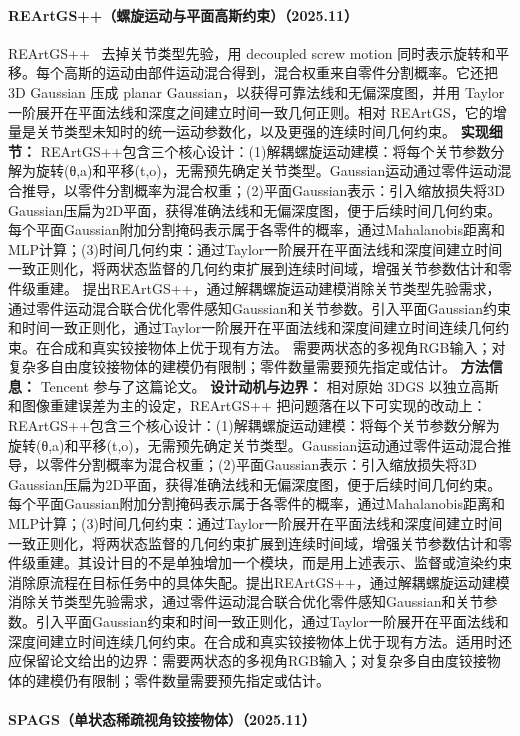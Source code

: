 \paragraph{REArtGS++（螺旋运动与平面高斯约束）（2025.11）}
REArtGS++~\cite{2511_17059} 去掉关节类型先验，用 decoupled screw motion 同时表示旋转和平移。每个高斯的运动由部件运动混合得到，混合权重来自零件分割概率。它还把 3D Gaussian 压成 planar Gaussian，以获得可靠法线和无偏深度图，并用 Taylor 一阶展开在平面法线和深度之间建立时间一致几何正则。相对 REArtGS，它的增量是关节类型未知时的统一运动参数化，以及更强的连续时间几何约束。
\textbf{实现细节：} REArtGS++包含三个核心设计：(1)解耦螺旋运动建模：将每个关节参数分解为旋转(θ,a)和平移(t,o)，无需预先确定关节类型。Gaussian运动通过零件运动混合推导，以零件分割概率为混合权重；(2)平面Gaussian表示：引入缩放损失将3D Gaussian压扁为2D平面，获得准确法线和无偏深度图，便于后续时间几何约束。每个平面Gaussian附加分割掩码表示属于各零件的概率，通过Mahalanobis距离和MLP计算；(3)时间几何约束：通过Taylor一阶展开在平面法线和深度间建立时间一致正则化，将两状态监督的几何约束扩展到连续时间域，增强关节参数估计和零件级重建。 提出REArtGS++，通过解耦螺旋运动建模消除关节类型先验需求，通过零件运动混合联合优化零件感知Gaussian和关节参数。引入平面Gaussian约束和时间一致正则化，通过Taylor一阶展开在平面法线和深度间建立时间连续几何约束。在合成和真实铰接物体上优于现有方法。 需要两状态的多视角RGB输入；对复杂多自由度铰接物体的建模仍有限制；零件数量需要预先指定或估计。
\textbf{方法信息：} Tencent 参与了这篇论文。
\textbf{设计动机与边界：} 相对原始 3DGS 以独立高斯和图像重建误差为主的设定，REArtGS++ 把问题落在以下可实现的改动上：REArtGS++包含三个核心设计：(1)解耦螺旋运动建模：将每个关节参数分解为旋转(θ,a)和平移(t,o)，无需预先确定关节类型。Gaussian运动通过零件运动混合推导，以零件分割概率为混合权重；(2)平面Gaussian表示：引入缩放损失将3D Gaussian压扁为2D平面，获得准确法线和无偏深度图，便于后续时间几何约束。每个平面Gaussian附加分割掩码表示属于各零件的概率，通过Mahalanobis距离和MLP计算；(3)时间几何约束：通过Taylor一阶展开在平面法线和深度间建立时间一致正则化，将两状态监督的几何约束扩展到连续时间域，增强关节参数估计和零件级重建。其设计目的不是单独增加一个模块，而是用上述表示、监督或渲染约束消除原流程在目标任务中的具体失配。提出REArtGS++，通过解耦螺旋运动建模消除关节类型先验需求，通过零件运动混合联合优化零件感知Gaussian和关节参数。引入平面Gaussian约束和时间一致正则化，通过Taylor一阶展开在平面法线和深度间建立时间连续几何约束。在合成和真实铰接物体上优于现有方法。适用时还应保留论文给出的边界：需要两状态的多视角RGB输入；对复杂多自由度铰接物体的建模仍有限制；零件数量需要预先指定或估计。
\paragraph{SPAGS（单状态稀疏视角铰接物体）（2025.11）}


